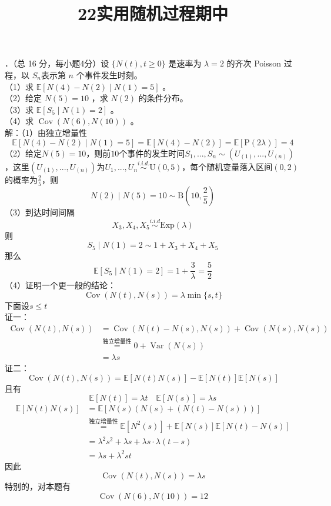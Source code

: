 \documentclass[UTF8]{ctexart}
\title{22实用随机过程期中}
\author{\textcalligra{NULIOUS}}
\date{}
\begin{document}
\maketitle
{}．（总 16 分，每小题4分）设 $\{N(t), t \geqslant 0\}$ 是速率为 $\lambda=2$ 的齐次 Poisson 过程，以 $S_{n}$表示第 $n$ 个事件发生时刻。\\
（1）求 $\mathbb{E}[N(4)-N(2) \mid N(1)=5]$ 。\\
（2）给定 $N(5)=10$ ，求 $N(2)$ 的条件分布。\\
（3）求 $\mathbb{E}\left[S_{5} \mid N(1)=2\right]$ 。\\
（4）求 $\operatorname{Cov}(N(6), N(10))$ 。\\
解：（1）由独立增量性
$$
\mathbb{E}[N(4)-N(2) \mid N(1)=5]=\mathbb{E}[N(4)-N(2)]=\mathbb{E}[\mathrm{P}(2\lambda)]=4
$$
（2）给定$N(5)=10$，则前$10$个事件的发生时间$S_1,...,S_n \sim (U_{(1)},...,U_{(n)})$，这里$(U_{(1)},...,U_{(n)})$为$U_1,...,U_n\stackrel{i.i.d.}{\sim}\mathrm{U}(0,5)$，每个随机变量落入区间$(0,2)$的概率为$\frac{2}{5}$，则
\[
N(2)\mid N(5)=10 \sim \mathrm{B}\left (10,\frac{2}{5}\right )
\]
（3）到达时间间隔
\[
X_3,X_4,X_5\stackrel{i.i.d}{\sim} \mathrm{Exp}(\lambda)
\]
则
\[
S_{5} \mid N(1)=2 \sim 1+X_3+X_4+X_5
\]
那么
\[
\mathbb{E}\left[S_{5} \mid N(1)=2\right]=1+\frac{3}{\lambda}=\frac{5}{2}
\]
（4）证明一个更一般的结论：
\[
\operatorname{Cov}\left(N(t),N(s) \right)=\lambda \min \{s,t\} 
\]
下面设$s\le t$\\
证一：
\begin{align*}
	\operatorname{Cov}\left(N(t),N(s) \right) &= \operatorname{Cov}\left(N(t)-N(s),N(s) \right)+\operatorname{Cov}\left(N(s),N(s) \right)   \\
	 &\stackrel{\text{独立增量性}}{=}0+\operatorname{Var}\left(N(s) \right) \\
	 &=\lambda s
\end{align*}
证二：
\[
\operatorname{Cov}\left(N(t),N(s) \right)=\mathbb{E}\left[N(t)N(s) \right]-\mathbb{E}[N(t)]\mathbb{E}[N(s)] 
\]
且有
\[
\mathbb{E}[N(t)]=\lambda t \quad \mathbb{E}[N(s)]=\lambda s
\]
\begin{align*}
	\mathbb{E}\left[N(t)N(s) \right] & =\mathbb{E}\left[N(s)\left(N(s)+\left(N(t)-N(s) \right)  \right)  \right] \\
	 & \stackrel{\text{独立增量性}}{=} \mathbb{E}\left[N^2(s) \right]+\mathbb{E}[N(s)]\mathbb{E}[N(t)-N(s)]\\
	 &= \lambda^2 s^2+\lambda s + \lambda s \cdot \lambda(t-s)\\
	 &=\lambda s +\lambda^2 st
\end{align*}
因此
\[
\operatorname{Cov}\left(N(t),N(s) \right)=\lambda s
\]
特别的，对本题有
\[
\operatorname{Cov}(N(6),N(10))=12
\]\\
\end{document}

